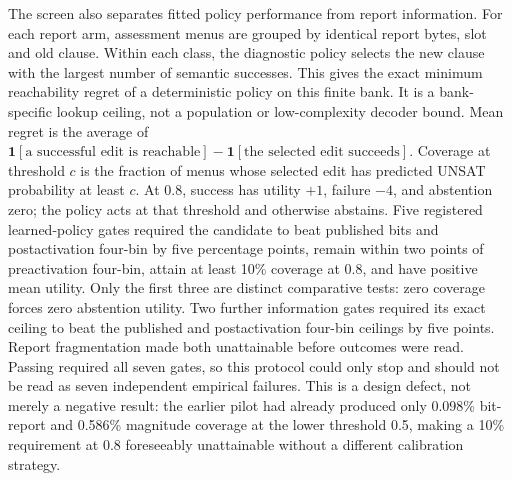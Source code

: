 \documentclass[
  british,
  11pt,
  a4paper,
]{article}
\begin{document}
The screen also separates fitted policy performance from report
information. For each report arm, assessment menus are grouped by
identical report bytes, slot and old clause. Within each class, the
diagnostic policy selects the new clause with the largest number of
semantic successes. This gives the exact minimum reachability regret of
a deterministic policy on this finite bank. It is a bank-specific lookup
ceiling, not a population or low-complexity decoder bound. Mean regret
is the average of
\(\mathbf1[\text{a successful edit is reachable}]-\mathbf1[\text{the selected edit succeeds}]\).
Coverage at threshold \(c\) is the fraction of menus whose selected edit
has predicted UNSAT probability at least \(c\). At 0.8, success has
utility \(+1\), failure \(-4\), and abstention zero; the policy acts at
that threshold and otherwise abstains. Five registered learned-policy
gates required the candidate to beat published bits and postactivation
four-bin by five percentage points, remain within two points of
preactivation four-bin, attain at least 10\% coverage at 0.8, and have
positive mean utility. Only the first three are distinct comparative
tests: zero coverage forces zero abstention utility. Two further
information gates required its exact ceiling to beat the published and
postactivation four-bin ceilings by five points. Report fragmentation
made both unattainable before outcomes were read. Passing required all
seven gates, so this protocol could only stop and should not be read as
seven independent empirical failures. This is a design defect, not
merely a negative result: the earlier pilot had already produced only
0.098\% bit-report and 0.586\% magnitude coverage at the lower threshold
0.5, making a 10\% requirement at 0.8 foreseeably unattainable without a
different calibration strategy.
\end{document}
